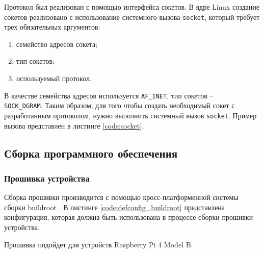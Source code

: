 Протокол был реализован с помощью интерфейса сокетов. В ядре Linux создание сокетов реализовано с использование системного вызова \texttt{socket}, который требует трех обязательных аргументов:

\begin{enumerate}
	\item семейство адресов сокета;
	\item тип сокетов;
	\item используемый протокол.
\end{enumerate} 

В качестве семейства адресов используется \texttt{AF\_INET}, тип сокетов -- \\ \texttt{SOCK\_DGRAM}. Таким образом, для того чтобы создать необходимый сокет с разработанным протоколом, нужно выполнить системный вызов \texttt{socket}. Пример вызова представлен в листинге \ref{code:socket}.


\subsection{Сборка программного обеспечения}

\subsubsection{Прошивка устройства}

Сборка прошивки производится с помощью кросс-платформенной системы сборки buildroot \cite{buildroot}. В листинге \ref{code:defconfig_buildroot} представлена конфигурация, которая должна быть использована в процессе сборки прошивки устройства.


Прошивка подойдет для устройств Raspberry Pi 4 Model B.

